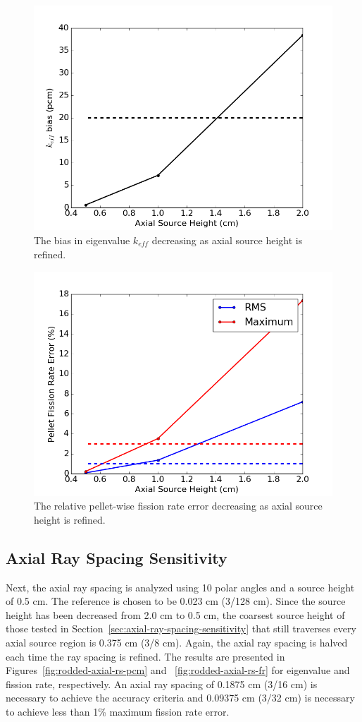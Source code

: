 \begin{figure}[h!]
	\centering
	\includegraphics[width=0.7\linewidth]{figures/results/sensitivity/rodded_source_height_pcm.png}
	\caption[]{The bias in eigenvalue $k_{\textit{eff}}$ decreasing as axial source height is refined.}
	\label{fig:rodded-axial-sh-pcm}
\end{figure}
\begin{figure}[h!]
	\centering
	\includegraphics[width=0.7\linewidth]{figures/results/sensitivity/rodded_source_height_fr.png}
	\caption[]{The relative pellet-wise fission rate error decreasing as axial source height is refined.}
	\label{fig:rodded-axial-sh-fr}
\end{figure}

\subsection{Axial Ray Spacing Sensitivity}

Next, the axial ray spacing is analyzed using 10 polar angles and a source height of 0.5 cm. The reference is chosen to be 0.023 cm (3/128 cm). Since the source height has been decreased from 2.0 cm to 0.5 cm, the coarsest source height of those tested in Section~\ref{sec:axial-ray-spacing-sensitivity} that still traverses every axial source region is 0.375 cm (3/8 cm). Again, the axial ray spacing is halved each time the ray spacing is refined. The results are presented in Figures~\ref{fig:rodded-axial-rs-pcm} and ~\ref{fig:rodded-axial-rs-fr} for eigenvalue and fission rate, respectively. An axial ray spacing of 0.1875 cm (3/16 cm) is necessary to achieve the accuracy criteria and 0.09375 cm (3/32 cm) is necessary to achieve less than 1\% maximum fission rate error.

